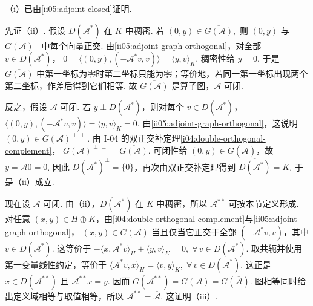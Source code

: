 \begin{FAProof}
（i）已由\autoref{ii05:adjoint-closed}证明.

先证（ii）. 假设 \(\displaystyle D(\mathcal A^*)\) 在 \(\displaystyle K\) 中稠密. 若
\(\displaystyle (0,y)\in\overline{G(\mathcal A)},\)
则 \(\displaystyle(0,y)\) 与 \(\displaystyle G(\mathcal A)^\perp\) 中每个向量正交. 由\autoref{ii05:adjoint-graph-orthogonal}，对全部 \(\displaystyle v\in D(\mathcal A^*)\)，
\(\displaystyle 0 = \langle(0,y),(-\mathcal A^*v,v)\rangle = \langle y,v\rangle_K.\)
稠密性给 \(\displaystyle y=0\). 于是 \(\displaystyle\overline{G(\mathcal A)}\) 中第一坐标为零时第二坐标只能为零；等价地，若同一第一坐标出现两个第二坐标，作差后得到它们相等. 故 \(\displaystyle\overline{G(\mathcal A)}\) 是算子图，\(\displaystyle\mathcal A\) 可闭.

反之，假设 \(\displaystyle\mathcal A\) 可闭. 若 \(\displaystyle y\perp D(\mathcal A^*)\)，则对每个 \(\displaystyle v\in D(\mathcal A^*)\)，
\(\displaystyle \langle(0,y),(-\mathcal A^*v,v)\rangle = \langle y,v\rangle_K = 0.\)
由\autoref{ii05:adjoint-graph-orthogonal}，这说明
\(\displaystyle (0,y)\in G(\mathcal A)^{\perp\perp}.\)
由 I-04 的双正交补定理\autoref{i04:double-orthogonal-complement}，
\(\displaystyle G(\mathcal A)^{\perp\perp}=\overline{G(\mathcal A)}.\)
可闭性给 \(\displaystyle(0,y)\in G(\overline{\mathcal A})\)，故 \(\displaystyle y=\overline{\mathcal A}0=0\). 因此 \(\displaystyle D(\mathcal A^*)^\perp=\{0\}\)，再次由双正交补定理得到 \(\displaystyle\overline{D(\mathcal A^*)}=K\). 于是（ii）成立.

现在设 \(\displaystyle\mathcal A\) 可闭. 由（ii），\(\displaystyle D(\mathcal A^*)\) 在 \(\displaystyle K\) 中稠密，所以 \(\displaystyle\mathcal A^{**}\) 可按本节定义形成. 对任意 \(\displaystyle(x,y)\in H\oplus K\)，由\autoref{i04:double-orthogonal-complement}与\autoref{ii05:adjoint-graph-orthogonal}，
\(\displaystyle (x,y)\in\overline{G(\mathcal A)}\)
当且仅当它正交于全部 \(\displaystyle(-\mathcal A^*v,v)\)，其中 \(\displaystyle v\in D(\mathcal A^*)\). 这等价于
\(\displaystyle -\langle x,\mathcal A^*v\rangle_H + \langle y,v\rangle_K = 0 ,\;\forall\,v\in D(\mathcal A^*).\)
取共轭并使用第一变量线性约定，等价于
\(\displaystyle \langle\mathcal A^*v,x\rangle_H = \langle v,y\rangle_K ,\;\forall\,v\in D(\mathcal A^*).\)
这正是 \(\displaystyle x\in D(\mathcal A^{**})\) 且 \(\displaystyle\mathcal A^{**}x=y\). 因而
\(\displaystyle G(\mathcal A^{**})=\overline{G(\mathcal A)}=G(\overline{\mathcal A}).\)
图相等同时给出定义域相等与取值相等，所以 \(\displaystyle\mathcal A^{**}=\overline{\mathcal A}\). 这证明（iii）.


\end{FAProof}
